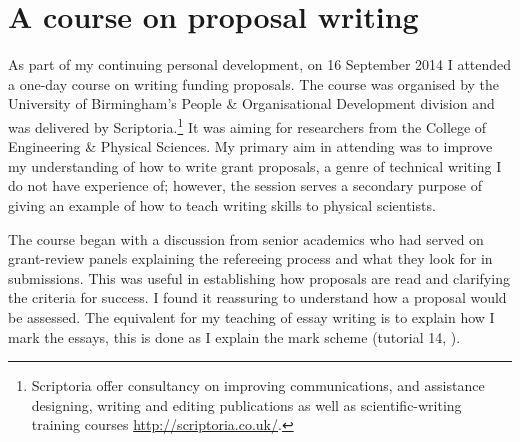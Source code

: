 \chapter{A course on proposal writing}\label{ap:Scriptoria}

As part of my continuing personal development, on 16 September 2014 I attended a one-day course on writing funding proposals. The course was organised by the University of Birmingham's People \& Organisational Development division and was delivered by Scriptoria.\footnote{Scriptoria offer consultancy on improving communications, and assistance designing, writing and editing publications as well as scientific-writing training courses \url{http://scriptoria.co.uk/}.} It was aiming for researchers from the College of Engineering \& Physical Sciences. My primary aim in attending was to improve my understanding of how to write grant proposals, a genre of technical writing I do not have experience of; however, the session serves a secondary purpose of giving an example of how to teach writing skills to physical scientists.

The course began with a discussion from senior academics who had served on grant-review panels explaining the refereeing process and what they look for in submissions. This was useful in establishing how proposals are read and clarifying the criteria for success. I found it reassuring to understand how a proposal would be assessed. The equivalent for my teaching of essay writing is to explain how I mark the essays, this is done as I explain the mark scheme (tutorial 14, ).

